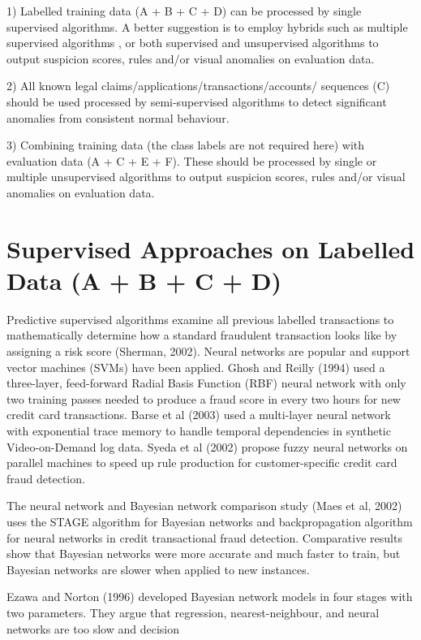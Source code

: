 \par
1) Labelled training data (A + B + C + D) can be processed by single
supervised algorithms. A better suggestion is to employ hybrids such as
multiple supervised algorithms , or both supervised and unsupervised
algorithms to output suspicion scores, rules and/or visual anomalies on
evaluation data.
\par
2) All known legal claims/applications/transactions/accounts/ sequences (C)
should be used processed by semi-supervised algorithms to detect significant
anomalies from consistent normal behaviour.
\par
3) Combining training data (the class labels are not required here) with
evaluation data (A + C + E + F). These should be processed by single or
multiple unsupervised algorithms to output suspicion scores, rules and/or
visual anomalies on evaluation data.


\section{Supervised Approaches on Labelled Data (A + B + C + D)}
Predictive supervised algorithms examine all previous labelled transactions
to mathematically determine how a standard fraudulent transaction looks like
by assigning a risk score (Sherman, 2002). Neural networks are popular and
support vector machines (SVMs) have been applied. Ghosh and Reilly (1994)
used a three-layer, feed-forward Radial Basis Function (RBF) neural network
with only two training passes needed to produce a fraud score in every two
hours for new credit card transactions. Barse et al (2003) used a multi-layer
neural network with exponential trace memory to handle temporal dependencies
in synthetic Video-on-Demand log data. Syeda et al (2002) propose fuzzy
neural networks on parallel machines to speed up rule production for
customer-specific credit card fraud detection.

\par
The neural network and Bayesian network comparison study (Maes et al, 2002)
uses the STAGE algorithm for Bayesian networks and backpropagation algorithm
for neural networks in credit transactional fraud detection. Comparative
results show that Bayesian networks were more accurate and much faster to
train, but Bayesian networks are slower when applied to new instances.

\par
Ezawa and Norton (1996) developed Bayesian network models in four stages with
two parameters. They argue that regression, nearest-neighbour, and neural
networks are too slow and decision


